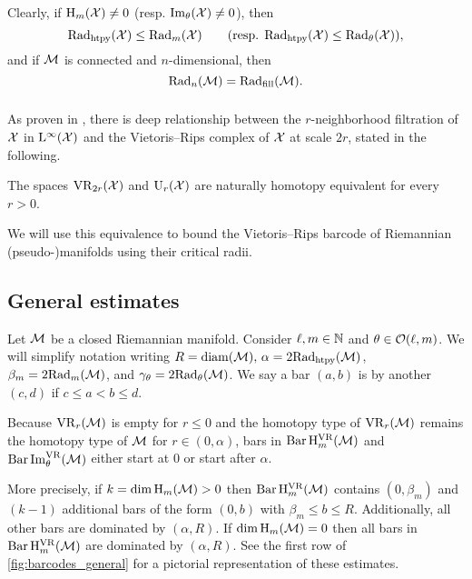 Clearly, if \(\mathrm{H}_m(\mathcal{X}) \neq 0\) (resp. \(\operatorname{Im}_\theta(\mathcal{X}) \neq 0\)), then
\[
\mathrm{Rad}_{\mathrm{htpy}}(\mathcal{X}) \leq \mathrm{Rad}_{m}(\mathcal{X}) \qquad (\text{resp. }\mathrm{Rad}_{\mathrm{htpy}}(\mathcal{X}) \leq  \mathrm{Rad}_{\theta}(\mathcal{X})),
\]
and if $\mathcal{M}$ is connected and $n$-dimensional, then
\[
\mathrm{Rad}_{n}(\mathcal{M}) = \mathrm{Rad}_{\mathrm{fill}}(\mathcal{M}).
\]

\subsubsection{}\label{ss:kuratowski_vr}

As proven in \cite[Thm.~4.1]{lim2024vietoris}, there is deep relationship between the \(r\)-neighborhood filtration of $\mathcal{X}$ in $\mathrm{L}^\infty(\mathcal{X})$ and the Vietoris--Rips complex of \(\mathcal{X}\) at scale \(2r\), stated in the following.

\medskip\proposition The spaces $\mathrm{VR}_{2r}(\mathcal{X})$ and $\mathrm{U}_r(\mathcal{X})$ are naturally homotopy equivalent for every \(r > 0\).

We will use this equivalence to bound the Vietoris--Rips barcode of Riemannian (pseudo-)manifolds using their critical radii.

\subsection{General estimates}\label{ss:barcode_general}

Let \(\mathcal{M}\) be a closed Riemannian manifold.
Consider \(\ell, m \in \mathbb{N}\) and \(\theta \in \mathcal{O}(\ell,m)\).
We will simplify notation writing \(R = \operatorname{diam}(\mathcal{M}),\, \alpha = 2\mathrm{Rad}_{\mathrm{htpy}}(\mathcal{M})\), \(\beta_m = 2\mathrm{Rad}_{m}(\mathcal{M})\), and \(\gamma_\theta = 2\mathrm{Rad}_{\theta}(\mathcal{M})\).
We say a bar $(a, b)$ is  by another $(c,d)$ if $c \leq a < b \leq d$.

Because $\mathrm{VR}_r(\mathcal{M})$ is empty for \(r \leq 0\) and the homotopy type of $\mathrm{VR}_r(\mathcal{M})$ remains the homotopy type of $\mathcal{M}$ for $r \in (0, \alpha)$, bars in \(\operatorname{Bar} \mathrm{H}_m^{\mathrm{VR}}(\mathcal{M})\) and $\operatorname{Bar}\operatorname{Im}_\theta^{\mathrm{VR}}(\mathcal{M})$ either start at $0$ or start after $\alpha$.

More precisely,
if \(k = \dim \operatorname{H}_m(\mathcal{M}) > 0\) then $\operatorname{Bar}\mathrm{H}_m^{\mathrm{VR}}(\mathcal{M})$ contains $(0, \beta_m)$ and \((k - 1)\) additional bars of the form \((0, b)\) with \(\beta_m \leq b \leq R\).
Additionally, all other bars are dominated by \((\alpha, R)\).
If \(\dim \operatorname{H}_m(\mathcal{M}) = 0\) then all bars in \(\operatorname{Bar}\mathrm{H}_m^{\mathrm{VR}}(\mathcal{M})\) are dominated by \((\alpha, R)\).
See the first row of \cref{fig:barcodes_general} for a pictorial representation of these estimates.

